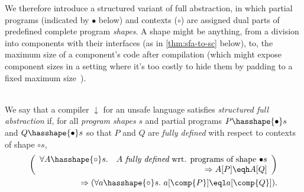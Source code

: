 \documentclass[10pt, conference, compsocconf, letterpaper, times]{IEEEtran}
\begin{document}
\label{sec:sfa}

We therefore introduce a structured variant of full abstraction, in which
partial programs (indicated by $\bullet$ below) and contexts ($\circ$) are
assigned dual parts of predefined complete program {\em shapes}.
A shape might be anything, from a division into components with their
interfaces (as in \autoref{thm:sfa-to-sc} below), to, \EG the maximum
size of a component's code after compilation (which might expose component
sizes in a setting where it's too costly to hide them by padding to a fixed
maximum size~\cite{PatrignaniDP16}).


\begin{defn}\label{defn:sfa}~\\
  We say that a compiler $\downarrow$ for an unsafe language
  satisfies {\em structured full abstraction} if, for all
  {\em program shapes} $s$ and partial programs
    $P \hasshape{\bullet} s$ and $Q \hasshape{\bullet} s$ so that
    $P$ and $Q$ are {\em fully defined} with respect to contexts of shape
    ${\circ}s$,
\[
\begin{array}{r}
\left(\begin{array}{r}
\forall A \hasshape{\circ} s.\quad
   A~\textit{fully defined}\text{ wrt. programs of shape }{\bullet}s\\
   \qquad\Rightarrow A[P] \eqh A[Q]
\end{array}\right)\\[1em]
\Rightarrow(\forall a \hasshape{\circ} s.~ a[\comp{P}] \eql a[\comp{Q}])
.
\end{array}
\]
\iffull
{}
\fi
\end{defn}
\end{document}
